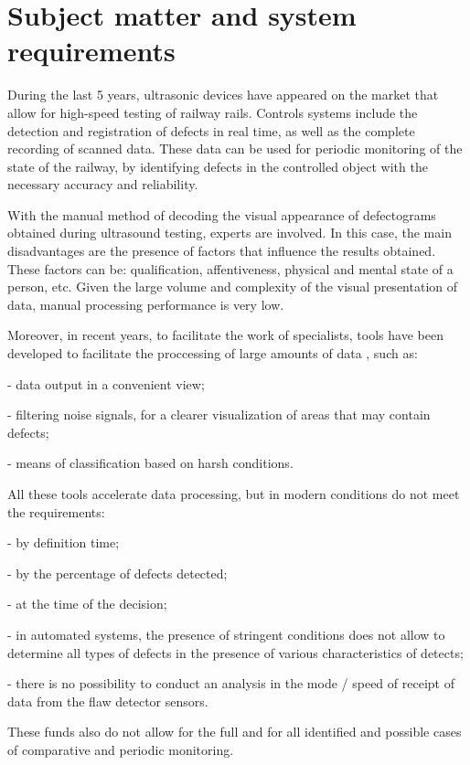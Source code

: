 \documentclass[a4paper, 12pt]{article}
\begin{document}
\section{Subject matter and system requirements}

During the last 5 years, ultrasonic devices have appeared on the market that allow for high-speed testing of railway rails. Controls systems include the detection and registration of defects in real time, as well as the complete recording of scanned data. These data can be used for periodic monitoring of the state of the railway, by identifying defects in the controlled  object with the necessary accuracy and reliability.

With the manual method of decoding the visual appearance of defectograms obtained during ultrasound testing, experts are involved. In this case, the main disadvantages are the presence of factors that influence the results obtained. These factors can be: qualification, affentiveness, physical and mental state of a person, etc. Given the large volume and complexity of the visual presentation of data, manual processing performance is very low.

Moreover, in recent years, to facilitate the work of specialists, tools have been developed to facilitate the proccessing of large amounts of data \cite{Armbruster}, such as:

- data output in a convenient view;

- filtering noise signals, for a clearer visualization of areas that may contain defects;

- means of classification based on harsh conditions.

All these tools accelerate data processing, but in modern conditions do not meet the requirements:

- by definition time;

- by the percentage of defects detected;

- at the time of the decision;

- in automated systems, the presence of stringent conditions does not allow to determine all types of defects in the presence of various characteristics of detects;

- there is no possibility to conduct an analysis in the mode / speed of receipt of data from the flaw detector sensors.

These funds also do not allow for the full and for all identified and possible cases of comparative and periodic monitoring.
\end{document}
